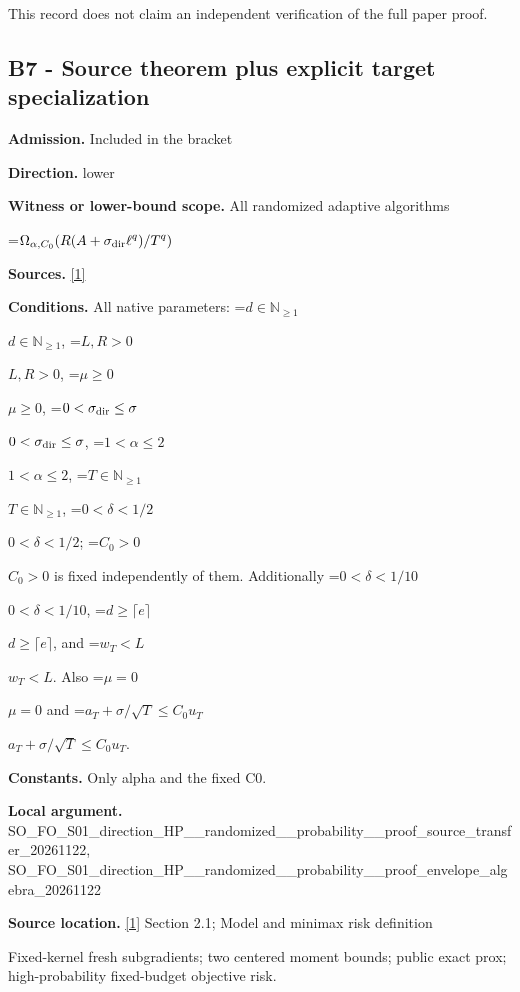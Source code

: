 \documentclass[10pt,a4paper]{article}
\newcommand{\AtlasMath}[1]{\par\begingroup\centering\setbox0=\hbox{$\displaystyle #1$}\ifdim\wd0>1.4\linewidth\typeout{ATLAS WIDE FORMULA: \the\wd0}\fi\ifdim\wd0>\linewidth\resizebox{\linewidth}{!}{\box0}\else\box0\fi\par\endgroup}
\newcommand{\AtlasInlineMath}[1]{\begingroup\setbox0=\hbox{$#1$}\ifdim\wd0>.4\linewidth\endgroup\AtlasMath{#1}\else\endgroup$#1$\fi}
\begin{document}
This record does not claim an independent verification of the full paper proof.



\subsection{B7 - Source theorem plus explicit target specialization}


\textbf{Admission.} Included in the bracket



\textbf{Direction.} lower



\textbf{Witness or lower-bound scope.} All randomized adaptive algorithms



\AtlasMath{\Omega_{\alpha,C_0}\!\left(R(A+\sigma_{\rm dir}\ell^q)/T^q\right)}


\textbf{Sources.} \href{https://arxiv.org/html/2610.00260v2}{[1]}



\textbf{Conditions.} All native parameters: \AtlasInlineMath{d\in\mathbb N_{\ge1}}, \AtlasInlineMath{L,R>0}, \AtlasInlineMath{\mu\ge0}, \AtlasInlineMath{0<\sigma_{\rm dir}\le\sigma}, \AtlasInlineMath{1<\alpha\le2}, \AtlasInlineMath{T\in\mathbb N_{\ge1}}, \AtlasInlineMath{0<\delta<1/2}; \AtlasInlineMath{C_0>0} is fixed independently of them. Additionally \AtlasInlineMath{0<\delta<1/10}, \AtlasInlineMath{d\ge\lceil e\rceil}, and \AtlasInlineMath{w_T<L}. Also \AtlasInlineMath{\mu=0} and \AtlasInlineMath{a_T+\sigma/\sqrt T\le C_0u_T}.



\textbf{Constants.} Only alpha and the fixed C0.



\textbf{Local argument.} SO\_FO\_S01\_direction\_HP\_\_\allowbreak{}randomized\_\_probability\_\allowbreak{}\_proof\_source\_transfer\_2\allowbreak{}0261122, SO\_FO\_S01\_direction\_HP\_\_\allowbreak{}randomized\_\_probability\_\allowbreak{}\_proof\_envelope\_algebra\_\allowbreak{}20261122



\textbf{Source location.} \href{https://arxiv.org/html/2610.00260v2}{[1]} Section 2.1; Model and minimax risk definition



Fixed-kernel fresh subgradients; two centered moment bounds; public exact prox; high-probability fixed-budget objective risk.
\end{document}
